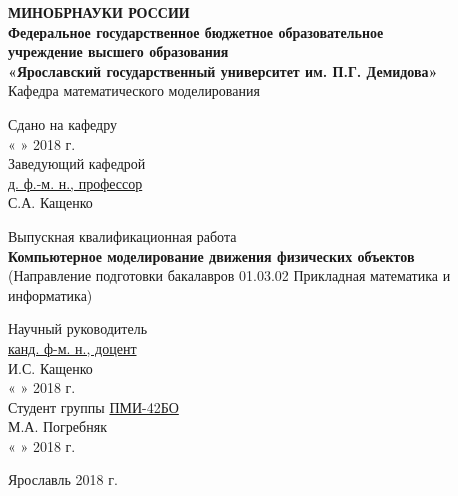 \documentclass[12pt, a4paper]{extarticle}
\numberwithin{equation}{section}
\begin{document}
\thispagestyle{empty} 
\medskip 

\begin{center} 
	\textbf{МИНОБРНАУКИ РОССИИ\\ 
		\vspace{0.5cm} 
		Федеральное государственное бюджетное образовательное\\ 
		учреждение высшего образования\\ 
		«Ярославский государственный университет им. П.Г. Демидова»}\\ 
	\vspace{0.5cm} 
	{Кафедра математического моделирования}\\ 
	\vspace{1.5cm} 
	
\end{center}
\begin{flushright} 
	Сдано на кафедру\\
	« 
	\underline{\phantom{aaa}} 
	» 
	\underline{\phantom{aaaaaaaaaaaaa}} 2018 г.\\ 
	Заведующий кафедрой\\
	\underline{\phantom{aaa}д. ф.-м. н., профессор\phantom{aaa}}\\ 
	\vspace{0.1cm} 
	\underline{\phantom{aaaaaaaaaaaaa}} С.А. Кащенко
\end{flushright}
\vspace{3cm} 
\begin{center} 
	Выпускная квалификационная работа\\ 
	\vspace{0.5cm} 
	\textbf{Компьютерное моделирование движения физических объектов}\\ 
	\small{(Направление подготовки бакалавров 01.03.02 Прикладная математика и информатика)}
	\vspace{3cm} 
\end{center} 

\begin{flushright} 
	Научный руководитель\\ 
	\underline{\phantom{aaa}канд. ф-м. н., доцент\phantom{aaa}}\\ 
	\vspace{0.1cm} 
	\underline{\phantom{aaaaaaaaaaaaa}} И.С. Кащенко\\ 
	« 
	\underline{\phantom{aaa}} 
	» 
	\underline{\phantom{aaaaaaaaaaaaa}} 2018 г.\\ 
	\vspace{0.5cm} 
	Студент группы \underline{\phantom{a}ПМИ-42БО\phantom{a}}\\ 
	\vspace{0.1cm} 
	\underline{\phantom{aaaaaaaaaaaaa}} М.А. Погребняк\\ 
	« 
	\underline{\phantom{aaa}} 
	» 
	\underline{\phantom{aaaaaaaaaaaaaa}}2018 г.\\ 
	\vspace{1cm} 
\end{flushright} 
\begin{center} 
	Ярославль 2018 г.
	\vspace{-1cm}  
\end{center} 
\end{document}
